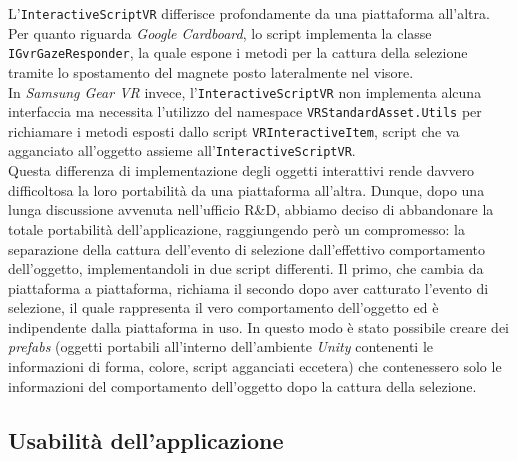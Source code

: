 L'\texttt{InteractiveScriptVR} differisce profondamente da una piattaforma all'altra. \\
Per quanto riguarda \textit{Google Cardboard}, lo script implementa la classe \texttt{IGvrGazeResponder}, la quale espone i metodi per la cattura della selezione tramite lo spostamento del magnete posto lateralmente nel visore. \\
In \textit{Samsung Gear VR} invece, l'\texttt{InteractiveScriptVR} non implementa alcuna interfaccia ma necessita l'utilizzo del namespace \texttt{VRStandardAsset.Utils} per richiamare i metodi esposti dallo script \texttt{VRInteractiveItem}, script che va agganciato all'oggetto assieme all'\texttt{InteractiveScriptVR}. \\
Questa differenza di implementazione degli oggetti interattivi rende davvero difficoltosa la loro portabilità da una piattaforma all'altra. Dunque, dopo una lunga discussione avvenuta nell'ufficio R\&D, abbiamo deciso di abbandonare la totale portabilità dell'applicazione, raggiungendo però un compromesso: la separazione della cattura dell'evento di selezione dall'effettivo comportamento dell'oggetto, implementandoli in due script differenti. Il primo, che cambia da piattaforma a piattaforma, richiama il secondo dopo aver catturato l'evento di selezione, il quale rappresenta il vero comportamento dell'oggetto ed è indipendente dalla piattaforma in uso. In questo modo è stato possibile creare dei \textit{prefabs} (oggetti portabili all'interno dell'ambiente \textit{Unity} contenenti le informazioni di forma, colore, script agganciati eccetera) che contenessero solo le informazioni del comportamento dell'oggetto dopo la cattura della selezione.    

\hypertarget{3.2.2}{\subsection{Usabilità dell'applicazione}}

